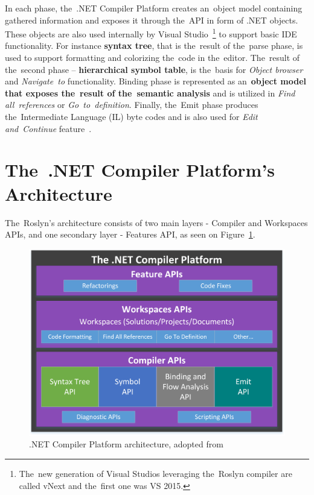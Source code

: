 \documentclass[
  digital, %
  table,   %
  lof,     %
  lot,     %
  oneside,
]{fithesis3}
\begin{document}
In each phase, the~.NET Compiler Platform creates an~object model containing gathered information and exposes it through the~API in form of .NET objects. These objects are also used internally by Visual Studio~\footnote{The~new generation of Visual Studios leveraging the~Roslyn compiler are called vNext and the~first one was VS 2015.} to support basic IDE functionality. For instance \textbf{syntax tree}, that is the~result of the~parse phase, is used to support formatting and colorizing the~code in the~editor. The~result of the~second phase -- \textbf{hierarchical symbol table}, is the~basis for \textit{Object browser} and \textit{Navigate~to} functionality. Binding phase is represented as an~\textbf{object model that exposes the~result of the~semantic analysis} and is utilized in \textit{Find all~references} or \textit{Go~to~definition}. Finally, the~Emit phase produces the~Intermediate Language (IL) byte codes and is also used for \textit{Edit and~Continue} feature~\cite{roslyn-overview}.

\section{The~.NET Compiler Platform's Architecture}
The~Roslyn's architecture consists of two main layers - Compiler and Workspaces APIs, and one secondary layer - Features API, as seen on Figure~\ref{fig:roslyn-compiler-architecture}.

\begin{figure}[h!]
		\centering
			\includegraphics[scale=0.85]{img/roslyn-compiler-architecture}
		\caption{.NET Compiler Platform architecture, adopted from~\cite{roslyn-succinctly}}
		\label{fig:roslyn-compiler-architecture}
\end{figure}
\end{document}

